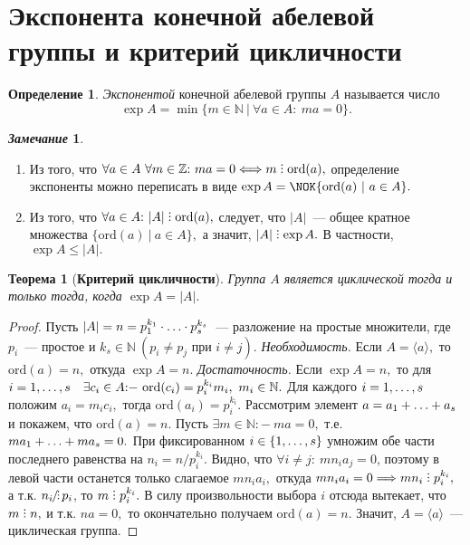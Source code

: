 \documentclass[a4paper, 14pt]{extarticle}
\newcommand{\integers}{\mathbb{Z}}
\newcommand{\naturals}{\mathbb{N}}
\newcommand{\ord}{\mathrm{ord}}
\newcommand{\suchthat}{{:}{-} \ }
\DeclareRobustCommand{\divby}{%
	\mathrel{\text{\vbox{\baselineskip.65ex\lineskiplimit0pt\hbox{.}\hbox{.}\hbox{.}}}}%
}
\DeclareRobustCommand{\ndivby}{%
	\mathrel{\text{%
			\vbox{\baselineskip.65ex\lineskiplimit0pt\hbox{.}\hbox{.}\hbox{.}}%
			\kern-1.5ex\hbox{/}%
	}}%
}
\theoremstyle{definition}
\newtheorem*{remark}{\textit{Замечание}}
\newtheorem*{definition*}{Определение}
\theoremstyle{plain}
\newtheorem*{theorem*}{Теорема}
\numberwithin{theorem}{section}
\numberwithin{definition}{section}
\numberwithin{statement}{section}
\numberwithin{lemma}{section}
\numberwithin{consequence}{section}
\begin{document}
	\section{Экспонента конечной абелевой группы и критерий цикличности}
	\begin{definition*}
		\textit{Экспонентой} конечной абелевой группы $A$ называется число
		\begin{equation*}
			\exp A =\min \{m \in \naturals \ | \ \forall a \in A{:} \ ma = 0\}.
		\end{equation*}
	\end{definition*}
	\begin{remark}
		\
		\begin{enumerate}
			\setlength\itemsep{0.1em}
			\item Из того, что ${\forall a \in A \  \forall m \in \integers{:} \ ma = 0 \Longleftrightarrow m \divby \ord(a),}$ определение экспоненты можно переписать в виде ${\exp A = \NOK \{\ord(a) \ | \ a \in A\}.}$
			\item Из того, что ${\forall a \in A{:} \ |A| \divby \ord(a),}$ следует, что $|A|$~--- общее кратное
			множества ${\{\ord(a) \ | \ a \in A\},}$ а значит, ${|A| \divby \exp A.}$ В частности,
			${\exp A \leqslant |A|.}$
		\end{enumerate}
	\end{remark}
	\begin{theorem*}[\textbf{Критерий цикличности}]
		Группа $A$ является циклической тогда и только тогда, когда ${\exp A = |A|.}$
	\end{theorem*}
	\begin{proof}
		Пусть ${|A| = n = p^{k_1}_1 \cdot \mathellipsis \cdot p^{k_s}_s}$~--- разложение на простые множители, где $p_i$~--- простое и ${k_s \in \naturals \ (p_i \neq p_j \text{ при } i \neq j).}$ \newline
		{\textit{Необходимость.}} Если ${A = \langle a \rangle,}$ то ${\ord (a) = n,}$ откуда ${\exp A = n.}$ \newline
		{\textit{Достаточность.}} Если ${\exp A = n,}$ то для ${i = 1, \mathellipsis, s \quad \exists c_i \in A \suchthat \ord(c_i) = p^{k_i}_i m_i, \ m_i \in \naturals.}$ Для каждого ${i = 1, \mathellipsis, s}$ положим ${a_i = m_i c_i,}$ тогда ${\ord(a_i) = p^{k_i}_i.}$ Рассмотрим элемент ${a = a_1 + \mathellipsis + a_s}$ и покажем, что ${\ord(a) = n.}$ Пусть ${\exists m \in \naturals \suchthat ma = 0,}$ т.е. ${ma_1 + \mathellipsis + ma_s = 0.}$ При фиксированном ${i \in \{1, \mathellipsis, s\}}$ умножим обе части последнего равенства на ${n_i = n/p^{k_i}_i.}$ Видно, что ${\forall i \neq j{:} \ mn_ia_j = 0}$, поэтому в левой части останется только слагаемое ${mn_ia_i,}$ откуда ${mn_ia_i = 0 \Longrightarrow mn_i \divby p^{k_i}_i,}$ а т.к. 
		${n_i \ndivby p_i}$, то ${m \divby p^{k_i}_i.}$  В силу произвольности выбора $i$ отсюда вытекает, что ${m \divby n,}$ и т.к. ${na = 0,}$ то окончательно получаем ${\ord(a) = n.}$ Значит, ${A = \langle a \rangle}$~--- циклическая группа.
	\end{proof}
	\newpage
\end{document}
